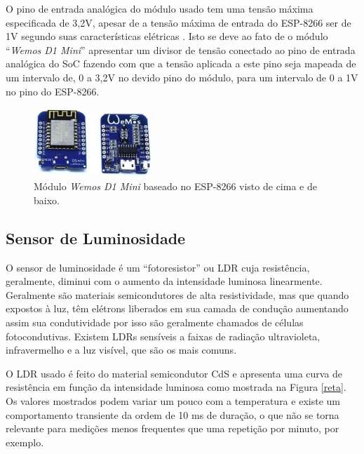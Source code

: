 O pino de entrada analógica do módulo usado tem uma tensão máxima especificada de 3,2V, apesar de a tensão máxima de entrada do ESP-8266 ser de 1V segundo suas características elétricas \cite{esp}. Isto se deve ao fato de o módulo ``\textit{Wemos D1 Mini}'' apresentar um divisor de tensão conectado ao pino de entrada analógica do SoC fazendo com que a tensão aplicada a este pino seja mapeada de um intervalo de, 0 a 3,2V no devido pino do módulo, para um intervalo de 0 a 1V no pino do ESP-8266.

\begin{figure}[ht]
    \begin{center}
    \includegraphics[width=0.4\textwidth]{figuras/wemos.PNG}
    \end{center}
    \caption[Ilustração do módulo \textit{Wemos D1 Mini}.]{Módulo \textit{Wemos D1 Mini} baseado no ESP-8266 visto de cima e de baixo.}
    \label{wemos}
\end{figure}

\subsection{Sensor de Luminosidade}

O sensor de luminosidade é um ``fotoresistor'' ou \acf{LDR} cuja resistência, geralmente, diminui com o aumento da intensidade luminosa linearmente. Geralmente são materiais semicondutores de alta resistividade, mas que quando expostos à luz, têm elétrons liberados em sua camada de condução aumentando assim sua condutividade por isso são geralmente chamados de células fotocondutivas. Existem LDRs sensíveis a faixas de radiação ultravioleta, infravermelho e a luz visível, que são os mais comuns.

O LDR usado \cite{ldr} é feito do material semicondutor CdS e apresenta uma curva de resistência em função da intensidade luminosa como mostrada na Figura \ref{reta}. Os valores mostrados podem variar um pouco com a temperatura e existe um comportamento transiente da ordem de 10 ms de duração, o que não se torna relevante para medições menos frequentes que uma repetição por minuto, por exemplo.

